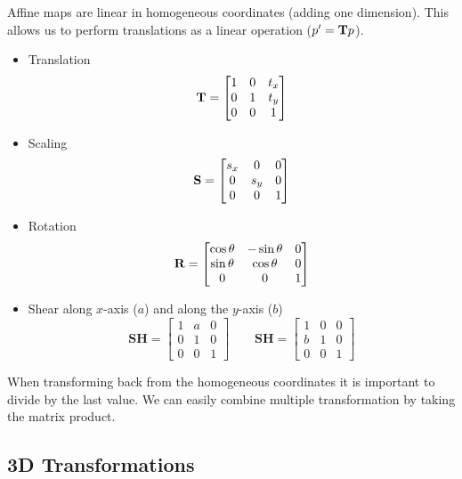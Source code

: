 Affine maps are linear in homogeneous coordinates (adding one dimension). This allows us to perform translations as a linear operation ($p' = \textbf T p$).

\begin{itemize}
	\item Translation	
	$$\textbf T = \begin{bmatrix}
		1 & 0 & t_x \\ 0 & 1 & t_y \\ 0 & 0 & 1
	\end{bmatrix}$$
	
	\item Scaling
	$$\textbf S = \begin{bmatrix}
		s_x & 0  & 0\\ 0 & s_y & 0 \\ 0 & 0 & 1
	\end{bmatrix}$$
	
	\item Rotation
	$$\textbf R = \begin{bmatrix}
		\cos \theta & - \sin \theta & 0 \\ \sin \theta & \cos \theta & 0 \\ 0 & 0 & 1
	\end{bmatrix}$$
	
	\item Shear along $x$-axis ($a$) and along the $y$-axis ($b$)
	$$\textbf{SH} = \begin{bmatrix}
		1 & a  & 0\\ 0 & 1 & 0 \\ 0 & 0 & 1
	\end{bmatrix} \qquad \textbf{SH} = \begin{bmatrix}
		1 & 0  & 0\\ b & 1 & 0 \\ 0 & 0 & 1
	\end{bmatrix}$$
\end{itemize}

When transforming back from the homogeneous coordinates it is important to divide by the last value. We can easily combine multiple transformation by taking the matrix product.


\subsection{3D Transformations}

